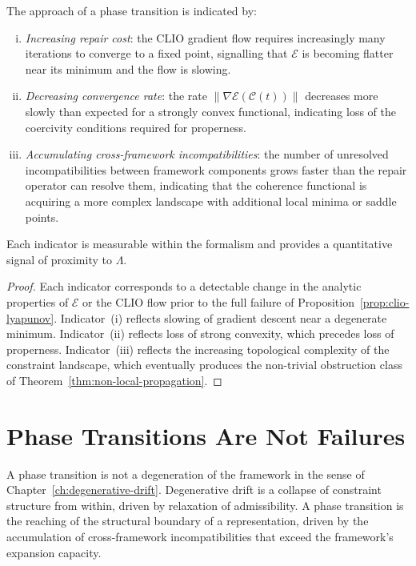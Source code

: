 \documentclass[11pt,openany]{book}
\begin{document}
\begin{proposition}
\label{prop:indicators}
The approach of a phase transition is indicated by:
\begin{enumerate}[(i)]
  \item \emph{Increasing repair cost}: the CLIO gradient
    flow requires increasingly many iterations to converge
    to a fixed point, signalling that $\mathcal{E}$ is
    becoming flatter near its minimum and the flow is
    slowing.
  \item \emph{Decreasing convergence rate}: the rate
    $\|\nabla \mathcal{E}(\mathcal{C}(t))\|$ decreases
    more slowly than expected for a strongly convex
    functional, indicating loss of the coercivity
    conditions required for properness.
  \item \emph{Accumulating cross-framework incompatibilities}:
    the number of unresolved incompatibilities between
    framework components grows faster than the repair
    operator can resolve them, indicating that the coherence
    functional is acquiring a more complex landscape with
    additional local minima or saddle points.
\end{enumerate}
Each indicator is measurable within the formalism and
provides a quantitative signal of proximity to $\Lambda$.
\end{proposition}

\begin{proof}
Each indicator corresponds to a detectable change in the
analytic properties of $\mathcal{E}$ or the CLIO flow
prior to the full failure of Proposition~\ref{prop:clio-lyapunov}.
Indicator~(i) reflects slowing of gradient descent near a
degenerate minimum.  Indicator~(ii) reflects loss of strong
convexity, which precedes loss of properness.
Indicator~(iii) reflects the increasing topological
complexity of the constraint landscape, which eventually
produces the non-trivial obstruction class of
Theorem~\ref{thm:non-local-propagation}.
\end{proof}

\section{Phase Transitions Are Not Failures}
\label{sec:not-failures}

A phase transition is not a degeneration of the framework
in the sense of Chapter~\ref{ch:degenerative-drift}.
Degenerative drift is a collapse of constraint structure
from within, driven by relaxation of admissibility.  A
phase transition is the reaching of the structural boundary
of a representation, driven by the accumulation of
cross-framework incompatibilities that exceed the
framework's expansion capacity.
\end{document}
